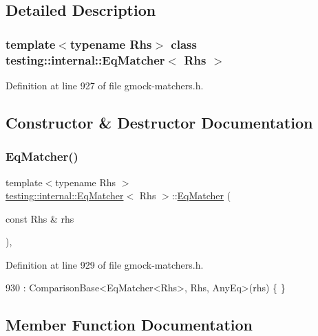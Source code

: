 \subsection{Detailed Description}
\subsubsection*{template$<$typename Rhs$>$\newline
class testing\+::internal\+::\+Eq\+Matcher$<$ Rhs $>$}



Definition at line 927 of file gmock-\/matchers.\+h.



\subsection{Constructor \& Destructor Documentation}
\mbox{\label{classtesting_1_1internal_1_1EqMatcher_a9051e33bc31f413a3c958d04cc090b46}} 
\subsubsection{\texorpdfstring{Eq\+Matcher()}{EqMatcher()}}
{\footnotesize\ttfamily template$<$typename Rhs $>$ \\
\hyperlink{classtesting_1_1internal_1_1EqMatcher}{testing\+::internal\+::\+Eq\+Matcher}$<$ Rhs $>$\+::\hyperlink{classtesting_1_1internal_1_1EqMatcher}{Eq\+Matcher} (\begin{DoxyParamCaption}\item[{const Rhs \&}]{rhs }\end{DoxyParamCaption})\hspace{0.3cm}{\ttfamily [inline]}, {\ttfamily [explicit]}}



Definition at line 929 of file gmock-\/matchers.\+h.


\begin{DoxyCode}
930       : ComparisonBase<EqMatcher<Rhs>, Rhs, AnyEq>(rhs) \{ \}
\end{DoxyCode}


\subsection{Member Function Documentation}
\mbox{\label{classtesting_1_1internal_1_1EqMatcher_a3ddc72ceade061ad56debfa0a4dc2749}} 
